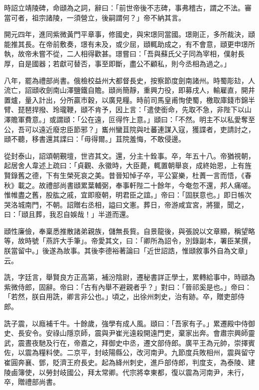 \begin{pinyinscope}
 時詔立靖陵碑，命頲為之詞，辭曰：「前世帝後不志碑，事弗稽古，謂之不法。審當可者，祖宗諸陵，一須營立，後嗣謂何？」帝不納其言。



 開元四年，進同紫微黃門平章事，修國史，與宋璟同當國。璟剛正，多所裁決，頲能推其長。在帝前敷奏，璟有未及，或少屈，頲輒助成之，有不會意，頲更申璟所執，故帝未嘗不從，二人相得歡甚。璟嘗曰：「吾與蘇氏父子同為宰相，僕射長厚，自是國器；若獻可替否，事至即斷，盡公不顧私，則今丞相為過之。」



 八年，罷為禮部尚書。俄檢校益州大都督長史，按察節度劍南諸州。時蜀彫攰，人流亡，詔頲收劍南山澤鹽鐵自贍。頲尚簡靜，重興力役，即募戌人，輸雇直，開井置爐，量入計出，分所贏市穀，以廣見糧。時前司馬皇甫恂使蜀，檄取庫錢市錦半臂、琵琶捍撥、玲瓏鞭，頲不肯予，因上言：「遣使銜命，先取不急，非陛下以山澤贍軍費意。」或謂頲：「公在遠，叵得忤上意。」頲曰：「不然。明主不以私愛奪至公，吾可以遠近廢忠臣節邪？」巂州蠻苴院與吐蕃連謀入寇，獲諜者，吏請討之，頲不聽，移書還其諜曰：「毋得爾。」苴院羞悔，不敢侵邊。



 從封泰山，詔頌朝覲壇，世咨其文。還，分主十銓事。卒，年五十八。帝猶視朝，起居舍人韋述上疏曰：「貞觀、永徽時，大臣薨，輒置朝舉哀，成終始恩，上有旌賢錄舊之德，下有生榮死哀之美。昔晉知悼子卒，平公宴樂，杜蕢一言而悟，《春秋》載之。故禮部尚書頲累葉輔弼，奉事軒陛二十餘年，今奄忽不還，邦人痛嗟。惟帷盡之舊，股肱之戚，宜即廢朝，明君臣之誼。」帝曰：「固朕意也。」即日帳次哭洛城南門，不朝。詔贈右丞相，謚曰文憲。葬日，帝游咸宜宮，將獵，聞之，曰：「頲且葬，我忍自娛哉！」半道而還。



 頲性廉儉，奉稟悉推散諸弟親族，儲無長貲。自景龍後，與張說以文章顯，稱望略等，故時號「燕許大手筆」。帝愛其文，曰：「卿所為詔令，別錄副本，署臣某撰，朕當留中。」後遂為故事。其後李德裕著論曰「近世詔誥，惟頲敘事外自為文章」云。



 詵，字廷言，舉賢良方正高第，補汾陰尉，遷秘書詳正學士，累轉給事中，時頲為紫微侍郎，固辭。帝曰：「古有內舉不避親者乎？」對曰：「晉祁奚是也。」帝曰：「若然，朕自用詵，卿言非公也。」頃之，出徐州刺史，治有跡。卒，贈吏部侍郎。



 詵子震，以廕補千牛。十餘歲，強學有成人風。頲曰：「吾家有子。」累遷殿中侍御史、長安令。安祿山隱京師，震與尹崔光遠殺開遠門吏，棄家出奔。會肅宗興師靈武，震晝夜馳及行在，帝嘉之，拜御史中丞，遷文部侍郎。廣平王為元帥，崇擇賓佐，以震為糧料使。二京平，封岐陽縣公，改河南尹。九節度兵敗相州，震與留守崔圓奔襄、鄧，貶濟王府長史。起為絳州刺史，進戶部侍郎，判度支，為泰陵、建陵鹵簿使，以勞封岐國公，拜太常卿。代宗將幸東都，復以震為河南尹，未行，卒，贈禮部尚書。




\end{pinyinscope}
